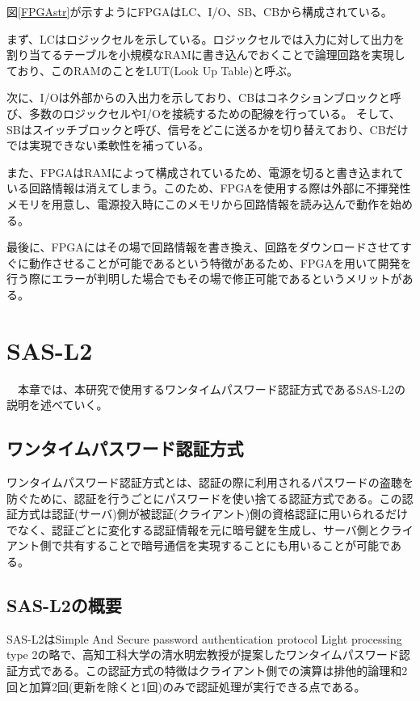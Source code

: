 \documentclass{thesis}
\begin{document}
図\ref{FPGAstr}が示すようにFPGAはLC、I/O、SB、CBから構成されている。\par
まず、LCはロジックセルを示している。ロジックセルでは入力に対して出力を割り当てるテーブルを小規模なRAMに書き込んでおくことで論理回路を実現しており、このRAMのことをLUT(Look Up Table)と呼ぶ。\par
次に、I/Oは外部からの入出力を示しており、CBはコネクションブロックと呼び、多数のロジックセルやI/Oを接続するための配線を行っている。
そして、SBはスイッチブロックと呼び、信号をどこに送るかを切り替えており、CBだけでは実現できない柔軟性を補っている。\cite{FPGAstr}\par
また、FPGAはRAMによって構成されているため、電源を切ると書き込まれている回路情報は消えてしまう。このため、FPGAを使用する際は外部に不揮発性メモリを用意し、電源投入時にこのメモリから回路情報を読み込んで動作を始める。\par
最後に、FPGAにはその場で回路情報を書き換え、回路をダウンロードさせてすぐに動作させることが可能であるという特徴があるため、FPGAを用いて開発を行う際にエラーが判明した場合でもその場で修正可能であるというメリットがある。\cite{FPGA}\par

\chapter{SAS-L2}
　本章では、本研究で使用するワンタイムパスワード認証方式であるSAS-L2の説明を述べていく。
\section{ワンタイムパスワード認証方式}
ワンタイムパスワード認証方式とは、認証の際に利用されるパスワードの盗聴を防ぐために、認証を行うごとにパスワードを使い捨てる認証方式である。この認証方式は認証(サーバ)側が被認証(クライアント)側の資格認証に用いられるだけでなく、認証ごとに変化する認証情報を元に暗号鍵を生成し、サーバ側とクライアント側で共有することで暗号通信を実現することにも用いることが可能である。%

\section{SAS-L2の概要}
SAS-L2はSimple And Secure password authentication protocol Light processing type 2の略で、高知工科大学の清水明宏教授が提案したワンタイムパスワード認証方式である。この認証方式の特徴はクライアント側での演算は排他的論理和2回と加算2回(更新を除くと1回)のみで認証処理が実行できる点である。%
　
\end{document}
